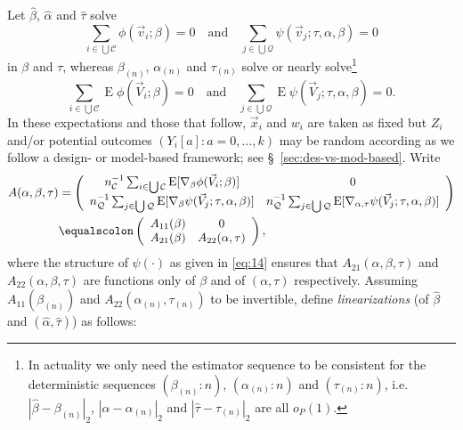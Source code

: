 \documentclass{article}
\newcommand{\eqdef}{\ensuremath{\equalscolon}}
\newcommand{\EE}{\operatorname{E}}
\begin{document}
Let $\hat\beta$, $\hat{\alpha}$ and $\hat\tau$ solve
\[\sum_{i\in \bigcup \mathcal{C}}\phi(\vec{v}_{i}; \beta )
  =0\quad\text{and}\quad
\sum_{j\in \bigcup \mathcal{Q}}\psi(\vec{v}_{j}; \tau,
\alpha, \beta )  =0
  \]
  in $\beta$ and $\tau$, whereas $\beta_{(n)}$, $\alpha_{(n)}$ and $\tau_{(n)}$ solve or nearly solve\footnote{%
In actuality we only need the estimator sequence to be consistent for the deterministic sequences $(\beta_{(n)}:n)$, $(\alpha_{(n)}:n)$ and $(\tau_{(n)}:n)$, i.e. $|\hat\beta - \beta_{(n)}|_{2}$, $|\hat\alpha - \alpha_{(n)}|_{2}$ and $|\hat\tau - \tau_{(n)}|_{2}$ are all $o_{P}(1)$.%
}
\[\sum_{i\in \bigcup \mathcal{C}}\EE\phi(\vec{V}_{i}; \beta )
  =0\quad\text{and}\quad
\sum_{j\in \bigcup \mathcal{Q}}\EE\psi(\vec{V}_{j}; \tau,
\alpha, \beta )  =0.
  \]
In these expectations and those that follow, $\vec{x}_{i}$ and $w_{i}$
are taken as fixed but $Z_{i}$ and/or potential outcomes $(Y_{i}[a]:
a=0, \ldots, k)$ may be random according as we follow a design- or
model-based framework; see \S~\ref{sec:des-vs-mod-based}.
  Write
  \begin{align}
\nonumber
    A(\alpha, \beta, \tau) &= \left(
      \begin{array}{cc}
        n_{\mathcal{C}}^{-1}\sum_{i\in \bigcup
        \mathcal{C}}\EE [\nabla_{\beta}\phi(\vec{V}_{i};
        \beta )]&0\\
        n_{\mathcal{Q}}^{-1}\sum_{j\in \bigcup
        \mathcal{Q}}\EE[ \nabla_{\beta}\psi(\vec{V}_{j};
        \tau, \alpha, \beta )]  & n_{\mathcal{Q}}^{-1}\sum_{j\in \bigcup
        \mathcal{Q}}\EE[ \nabla_{\alpha, \tau}\psi(\vec{V}_{j};
        \tau, \alpha, \beta )]
      \end{array}
                                  \right)\\
    \label{eq:13}    
    &\eqdef \left(
      \begin{array}{cc}
        A_{11}(\beta)& 0\\
        A_{21}(\beta) & A_{22}(\alpha, \tau)
      \end{array}
\right),
  \end{align}
where the structure of $\psi(\cdot)$ as given in \eqref{eq:14} ensures
that $A_{21}(\alpha, \beta, \tau)$ and $A_{22}(\alpha, \beta, \tau)$
are functions only of $\beta$ and of $(\alpha, \tau)$
respectively. Assuming $A_{11}(\beta_{(n)})$ and $A_{22}(\alpha_{(n)},
\tau_{(n)})$ to be invertible, define \textit{linearizations} (of
$\hat\beta$ and $(\hat\alpha, \hat\tau)$) as follows:
\end{document}
